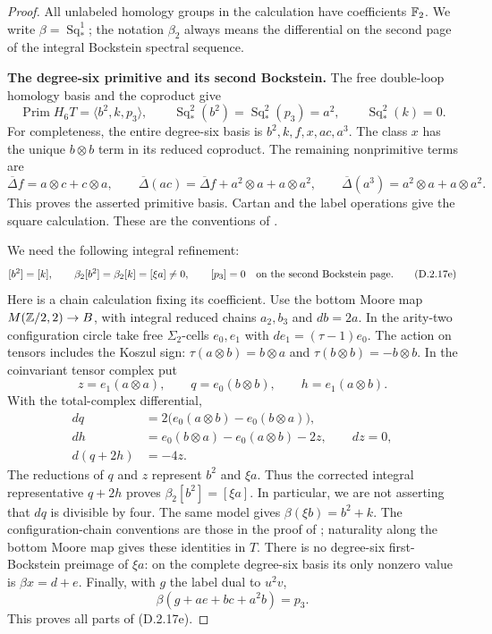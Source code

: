 \begin{proof}
All unlabeled homology groups in the calculation have coefficients
$\mathbb F_2$. We write $\beta=\operatorname{Sq}_*^1$; the notation
$\beta_2$ always means the differential on the second page of the
integral Bockstein spectral sequence.

\medskip\noindent
\textbf{The degree-six primitive and its second Bockstein.}
The free double-loop homology basis and the coproduct give
\[
 \operatorname{Prim}H_6T=\langle b^2,k,p_3\rangle,
 \qquad
 \operatorname{Sq}_*^2(b^2)=\operatorname{Sq}_*^2(p_3)=a^2,
 \qquad \operatorname{Sq}_*^2(k)=0.
 \tag{D.2.17d}
\]
For completeness, the entire degree-six basis is
$b^2,k,f,x,ac,a^3$. The class $x$ has the unique $b\otimes b$
term in its reduced coproduct. The remaining nonprimitive terms are
\[
 \overline\Delta f=a\otimes c+c\otimes a,
 \qquad
 \overline\Delta(ac)=\overline\Delta f+a^2\otimes a+a\otimes a^2,
 \qquad
 \overline\Delta(a^3)=a^2\otimes a+a\otimes a^2.
\]
This proves the asserted primitive basis. Cartan and the label
operations give the square calculation. These are the conventions
of \cite[Chapter~III, Theorems~1.2--1.4 and 3.1--3.2]{I_CohenLadaMay1976}.

We need the following integral refinement:
\[
 [b^2]=[k],\qquad
 \beta_2[b^2]=\beta_2[k]=[\xi a]\ne0,
 \qquad [p_3]=0
 \quad\hbox{on the second Bockstein page.}
 \tag{D.2.17e}
\]
Here is a chain calculation fixing its coefficient. Use the bottom
Moore map $M(\mathbb Z/2,2)\to B$, with integral reduced chains $a_2,b_3$
and $db=2a$. In the arity-two configuration circle take free
$\Sigma_2$-cells $e_0,e_1$ with $de_1=(\tau-1)e_0$.
The action on tensors includes the Koszul sign:
$\tau(a\otimes b)=b\otimes a$ and
$\tau(b\otimes b)=-b\otimes b$. In the coinvariant tensor complex put
\[
 z=e_1(a\otimes a),\qquad
 q=e_0(b\otimes b),\qquad h=e_1(a\otimes b).
\]
With the total-complex differential,
\[
\begin{split}
 dq&=2\bigl(e_0(a\otimes b)-e_0(b\otimes a)\bigr),\\
 dh&=e_0(b\otimes a)-e_0(a\otimes b)-2z,\qquad dz=0,\\
 d(q+2h)&=-4z.
\end{split}
 \tag{D.2.17f}
\]
The reductions of $q$ and $z$ represent $b^2$ and $\xi a$.
Thus the corrected integral representative $q+2h$ proves
$\beta_2[b^2]=[\xi a]$. In particular, we are not asserting that
$dq$ is divisible by four. The same model gives
$\beta(\xi b)=b^2+k$. The configuration-chain conventions are those
in the proof of \cite[Chapter~III, Lemma~3.10, p.~232]{I_CohenLadaMay1976};
naturality along the bottom Moore map gives these identities in $T$.
There is no degree-six first-Bockstein preimage of $\xi a$:
on the complete degree-six basis its only nonzero value is
$\beta x=d+e$. Finally, with $g$ the label dual to $u^2v$,
\[
 \beta(g+ae+bc+a^2b)=p_3.
\]
This proves all parts of \textup{(D.2.17e)}.


\end{proof}
